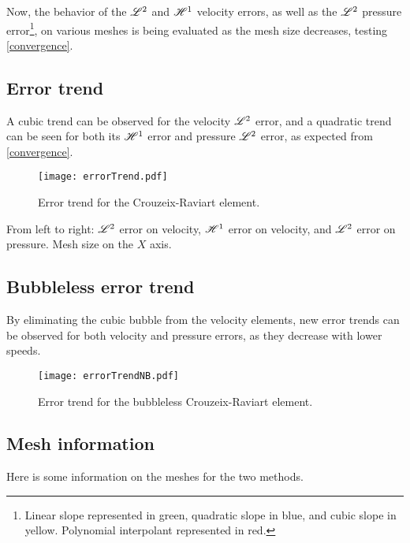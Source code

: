 Now, the behavior of the $\mathscr{L}^2$ and $\mathscr{H}^1$ velocity errors, as well as the $\mathscr{L}^2$ pressure error\footnote{Linear slope represented in \textcolor{solarized-green}{green}, quadratic slope in \textcolor{solarized-blue}{blue}, and cubic slope in \textcolor{solarized-yellow}{yellow}. Polynomial interpolant represented in \textcolor{solarized-red}{red}.}, on various meshes is being evaluated as the mesh size decreases, testing \ref{convergence}.

\subsection{Error trend}

A cubic trend can be observed for the velocity $\mathscr{L}^2$ error, and a quadratic trend can be seen for both its $\mathscr{H}^1$ error and pressure $\mathscr{L}^2$ error, as expected from \ref{convergence}.

\begin{figure}[!ht]
	\centering
	\texttt{[image: errorTrend.pdf]}
	\caption{Error trend for the Crouzeix-Raviart element.}
\end{figure}

From left to right: $\mathscr{L}^2$ error on velocity, $\mathscr{H}^1$ error on velocity, and $\mathscr{L}^2$ error on pressure. Mesh size on the $X$ axis.

\newpage
\subsection{Bubbleless error trend}

By eliminating the cubic bubble from the velocity elements, new error trends can be observed for both velocity and pressure errors, as they decrease with lower speeds.

\begin{figure}[!ht]
	\centering
	\texttt{[image: errorTrendNB.pdf]}
	\caption{Error trend for the bubbleless Crouzeix-Raviart element.}
\end{figure}

\newpage
\subsection{Mesh information}

Here is some information on the meshes for the two methods.

\begin{multicols}{2}
	
	
\end{multicols}

